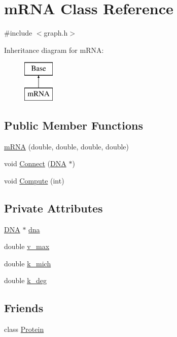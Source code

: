 \hypertarget{classm_r_n_a}{\section{m\-R\-N\-A Class Reference}
\label{classm_r_n_a}
}


{\ttfamily \#include $<$graph.\-h$>$}

Inheritance diagram for m\-R\-N\-A\-:\begin{figure}[H]
\begin{center}
\leavevmode
\includegraphics[height=2.000000cm]{classm_r_n_a}
\end{center}
\end{figure}
\subsection*{Public Member Functions}
\begin{DoxyCompactItemize}
\item 
\hyperlink{classm_r_n_a_a1fc26dc1fe542e23f9d374533600b9fb}{m\-R\-N\-A} (double, double, double, double)
\item 
void \hyperlink{classm_r_n_a_ac010324e6b1dc61fb8e1391b219acb2c}{Connect} (\hyperlink{class_d_n_a}{D\-N\-A} $\ast$)
\item 
void \hyperlink{classm_r_n_a_a490f8026d612c405ce2678a4d15cf7a8}{Compute} (int)
\end{DoxyCompactItemize}
\subsection*{Private Attributes}
\begin{DoxyCompactItemize}
\item 
\hyperlink{class_d_n_a}{D\-N\-A} $\ast$ \hyperlink{classm_r_n_a_ace67bd5431ec023732e05049e5ca9a4b}{dna}
\item 
double \hyperlink{classm_r_n_a_a07cdcbe61a2af4fc74751521e0c7920e}{v\-\_\-max}
\item 
double \hyperlink{classm_r_n_a_ace3b5460f5ed647cbe52e6a86e8d6ef7}{k\-\_\-mich}
\item 
double \hyperlink{classm_r_n_a_ac4e84c4700ca924196809e36fa17c5b7}{k\-\_\-deg}
\end{DoxyCompactItemize}
\subsection*{Friends}
\begin{DoxyCompactItemize}
\item 
class \hyperlink{classm_r_n_a_a2cc8b86817f46f61585ecf591984f8eb}{Protein}
\end{DoxyCompactItemize}
